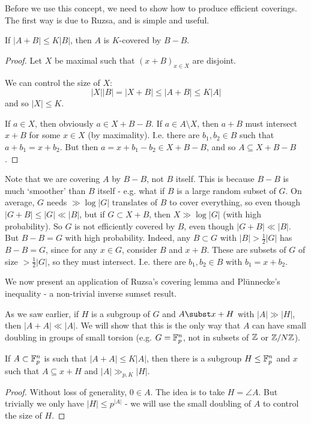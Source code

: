 \documentclass[10pt,a4paper]{article}
\begin{document}
Before we use this concept, we need to show how to produce efficient coverings. The first way is due to Ruzsa, and is simple and useful.
\begin{lemma}
  If $|A+B|\leq K|B|$, then $A$ is $K$-covered by $B-B$.
\end{lemma}
\begin{proof}
  Let $X$ be maximal such that $(x+B)_{x\in X}$ are disjoint.

  We can control the size of $X$:
  \[|X||B|=|X+B| \leq |A+B| \leq K|A|\]
  and so $|X|\leq K$.

  If $a \in X$, then obviously $a\in X+B - B$. If $a \in A\setminus X$, then $a+B$ must intersect $x+B$ for some $x \in X$ (by maximality). I.e. there are $b_1, b_2 \in B$ such that $a+b_1 = x+b_2$. But then $a= x+b_1-b_2 \in X+B-B$, and so $A \subseteq X+B-B$.
\end{proof}
Note that we are covering $A$ by $B-B$, not $B$ itself. This is because $B-B$ is much `smoother' than $B$ itself - e.g. what if $B$ is a large random subset of $G$. On average, $G$ needs $\gg \log |G|$ translates of $B$ to cover everything, so even though $|G+B| \leq |G| \ll |B|$, but if $G \subset X+B$, then $X \gg \log |G|$ (with high probability). So $G$ is not efficiently covered by $B$, even though $|G+B|\ll |B|$. But $B-B = G$ with high probability. Indeed, any $B\subset G$ with $|B|>\frac12 |G|$ has $B-B=G$, since for any $x \in G$, consider $B$ and $x+B$. These are subsets of $G$ of size $>\frac12 |G|$, so they must intersect. I.e. there are $b_1, b_2 \in B$ with $b_1 = x+b_2$.

We now present an application of Ruzsa's covering lemma and Pl\"unnecke's inequality -  a non-trivial inverse sumset result.

As we saw earlier, if $H$ is a subgroup of $G$ and $A \subst x+H$ with $|A|\gg|H|$, then $|A+A| \ll |A|$. We will show that this is the only way that $A$ can have small doubling in groups of small torsion (e.g. $G = \mathbb{F}_p^n$, not in subsets of $\mathbb{Z}$ or $\mathbb{Z}/N\mathbb{Z}$).
\begin{theorem}
  If $A \subset \mathbb{F}_p^n$ is such that $|A+A|\leq K|A|$, then there is a subgroup $H \leq \mathbb{F}_p^n$ and $x$ such that $A \subseteq x+H$ and $|A|\gg_{p, K}|H|$.
\end{theorem}
\begin{proof}
  Without loss of generality, $0 \in A$. The idea is to take $H = \angle{A}$. But trivially we only have $|H|\leq p^{|A|}$ - we will use the small doubling of $A$ to control the size of $H$.
\end{proof}
\end{document}
